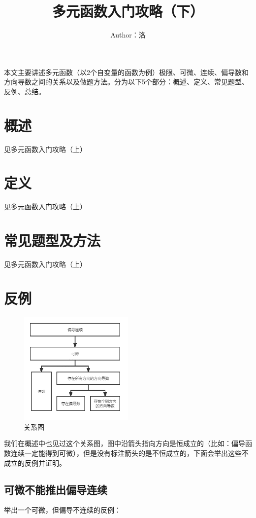 \documentclass{article}
\title{多元函数入门攻略（下）}
\date{}
\author{Author：洛}
\begin{document}
\maketitle


本文主要讲述多元函数（以2个自变量的函数为例）极限、可微、连续、偏导数和方向导数之间的关系以及做题方法。分为以下5个部分：概述、定义、常见题型、反例、总结。



\tableofcontents

\newpage
\setcounter{page}{1}

\section{概述}
见多元函数入门攻略（上）

\section{定义}
见多元函数入门攻略（上）

\section{常见题型及方法}
见多元函数入门攻略（上）

\section{反例}
\begin{figure}[!h]
    \centering
    \includegraphics[width=0.5\textwidth]{pic/01.png}
    \caption{关系图}
\end{figure}

我们在概述中也见过这个关系图，图中沿箭头指向方向是恒成立的（比如：偏导函数连续一定能得到可微），但是没有标注箭头的是不恒成立的，下面会举出这些不成立的反例并证明。

\subsection{可微不能推出偏导连续}
举出一个可微，但偏导不连续的反例：
\end{document}
